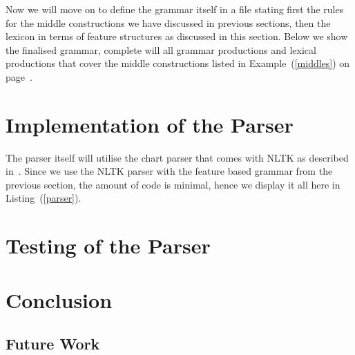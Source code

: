 \documentclass[12pt,%
]{lin-v2/lin}
\let\Oldsubsection\subsection
\renewcommand{\subsection}{\FloatBarrier\Oldsubsection}
\newcommand{\pref}[1]{(\ref{#1})}
\begin{document}
Now we will move on to define the grammar itself in a file stating first the rules for
the middle constructions we have discussed in previous sections, then the lexicon in
terms of feature structures as discussed in this section. Below we show the finalised
grammar, complete will all grammar productions and lexical productions that cover the
middle constructions listed in Example~\pref{middles} on page~\pageref{middles}.





\section{Implementation of the Parser}

The parser itself will utilise the chart parser that comes with NLTK as described in~\citep[Chapter 9]{nltk}.
Since we use the NLTK parser with the feature based grammar from the previous section,
the amount of code is minimal, hence we display it all here in Listing~\pref{parser}.




\section{Testing of the Parser}




\section{Conclusion}

\subsection{Future Work}


\clearpage
    

\end{document}
